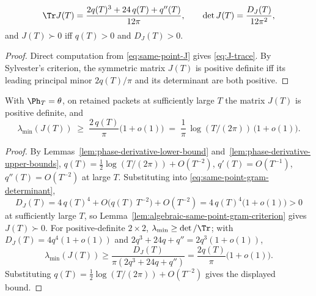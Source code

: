 \begin{lemma}
\label{lem:algebraic-same-point-gram-criterion}
\begin{equation}
\label{eq:J-trace}
\Tr J(T) = \frac{2 q(T)^3 + 24\,q(T) + q''(T)}{12\pi},\qquad
\det J(T) = \frac{D_J(T)}{12\pi^2},
\end{equation}
and \(J(T)\succ 0\) iff \(q(T) > 0\) and \(D_J(T) > 0\).
\end{lemma}

\begin{proof}
Direct computation from \eqref{eq:same-point-J} gives
\eqref{eq:J-trace}.  By Sylvester's criterion, the symmetric matrix
\(J(T)\) is positive definite iff its leading principal minor
\(2q(T)/\pi\) and its determinant are both positive.
\end{proof}

\begin{lemma}
\label{lem:same-point-gram-positivity}
With \(\Ph_T = \theta\), on retained packets at sufficiently large
\(T\) the matrix \(J(T)\) is positive definite, and
\[
\lambda_{\min}(J(T))
\;\ge\; \frac{2\,q(T)}{\pi}\bigl(1 + o(1)\bigr)
\;=\; \frac{1}{\pi}\,\log(T/(2\pi))\,\bigl(1 + o(1)\bigr).
\]
\end{lemma}

\begin{proof}
By Lemmas~\ref{lem:phase-derivative-lower-bound}
and~\ref{lem:phase-derivative-upper-bounds},
\(q(T) = \tfrac12 \log(T/(2\pi)) + O(T^{-2})\),
\(q'(T) = O(T^{-1})\), \(q''(T) = O(T^{-2})\) at large \(T\).
Substituting into \eqref{eq:same-point-gram-determinant},
\[
D_J(T)
= 4\,q(T)^4 + O\bigl(q(T)\,T^{-2}\bigr) + O(T^{-2})
= 4\,q(T)^4\bigl(1 + o(1)\bigr) > 0
\]
at sufficiently large \(T\), so
Lemma~\ref{lem:algebraic-same-point-gram-criterion} gives
\(J(T)\succ 0\).  For positive-definite \(2\times 2\),
\(\lambda_{\min}\ge \det/\Tr\); with
\(D_J(T) = 4q^4(1+o(1))\) and \(2q^3+24q+q'' = 2q^3(1+o(1))\),
\[
\lambda_{\min}(J(T))
\ge \frac{D_J(T)}{\pi(2q^3+24q+q'')}
= \frac{2q(T)}{\pi}\bigl(1+o(1)\bigr).
\]
Substituting \(q(T) = \tfrac12 \log(T/(2\pi)) + O(T^{-2})\) gives
the displayed bound.
\end{proof}

